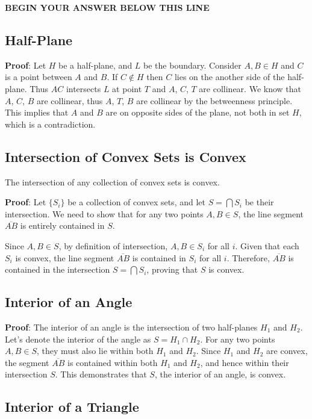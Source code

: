 \documentclass[letter,12pt]{article}
\newcommand{\answerspacetop}{
	\begin{center}
		\textbf{BEGIN YOUR ANSWER BELOW THIS LINE} \\ \hrulefill
	\end{center}
}
\begin{document}
\answerspacetop

\subsection*{Half-Plane}

\textbf{Proof}: Let $H$ be a half-plane, and $L$ be the boundary. Consider $A, B \in H$ and $C$ is a point between $A$ and $B$. If $C \notin H$ then $C$ lies on the another side of the half-plane. Thus $AC$ intersects $L$ at point $T$ and $A$, $C$, $T$ are collinear. We know that $A$, $C$, $B$ are collinear, thus $A$, $T$, $B$ are collinear by the betweenness principle. This implies that $A$ and $B$ are on opposite sides of the plane, not both in set $H$, which is a contradiction.

\subsection*{Intersection of Convex Sets is Convex}

The intersection of any collection of convex sets is convex.

\textbf{Proof}: Let $\{S_i\}$ be a collection of convex sets, and let $S = \bigcap S_i$ be their intersection. We need to show that for any two points $A, B \in S$, the line segment $\overline{AB}$ is entirely contained in $S$.

Since $A, B \in S$, by definition of intersection, $A, B \in S_i$ for all $i$. Given that each $S_i$ is convex, the line segment $\overline{AB}$ is contained in $S_i$ for all $i$. Therefore, $\overline{AB}$ is contained in the intersection $S = \bigcap S_i$, proving that $S$ is convex.

\subsection*{Interior of an Angle}

\textbf{Proof}: The interior of an angle is the intersection of two half-planes $H_1$ and $H_2$. Let's denote the interior of the angle as $S = H_1 \cap H_2$. For any two points $A, B \in S$, they must also lie within both $H_1$ and $H_2$. Since $H_1$ and $H_2$ are convex, the segment $\overline{AB}$ is contained within both $H_1$ and $H_2$, and hence within their intersection $S$. This demonstrates that $S$, the interior of an angle, is convex.

\subsection*{Interior of a Triangle}
\end{document}
